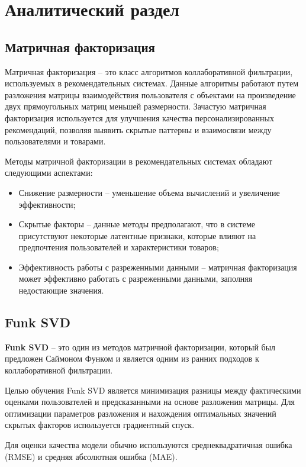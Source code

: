 \section{Аналитический раздел}

\subsection{Матричная факторизация}
Матричная факторизация -- это класс алгоритмов коллаборативной фильтрации, используемых в рекомендательных системах. Данные алгоритмы работают путем разложения матрицы взаимодействия пользователя с объектами на произведение двух прямоугольных матриц меньшей размерности. Зачастую матричная факторизация используется для улучшения качества персонализированных рекомендаций, позволяя выявить скрытые паттерны и взаимосвязи между пользователями и товарами.\cite{factorization}

Методы матричной факторизации в рекомендательных системах обладают следующими аспектами:

\begin{itemize}
	\item Снижение размерности -- уменьшение объема вычислений и увеличение эффективности;
	\item Скрытые факторы -- данные методы предполагают, что в системе присутствуют некоторые латентные признаки, которые влияют на предпочтения пользователей и характеристики товаров;
	\item Эффективность работы с разреженными данными -- матричная факторизация может эффективно работать с разреженными данными, заполняя недостающие значения.
\end{itemize}

\subsection{Funk SVD}
\textbf{Funk SVD} -- это один из методов матричной факторизации, который был предложен Саймоном Функом и является одним из ранних подходов к коллаборативной фильтрации.

Целью обучения Funk SVD является минимизация разницы между фактическими оценками пользователей и предсказанными на основе разложения матрицы. Для оптимизации параметров разложения и нахождения оптимальных значений скрытых факторов используется градиентный спуск. \cite{svd}

Для оценки качества модели обычно используются среднеквадратичная ошибка (RMSE) и средняя абсолютная ошибка (MAE).

